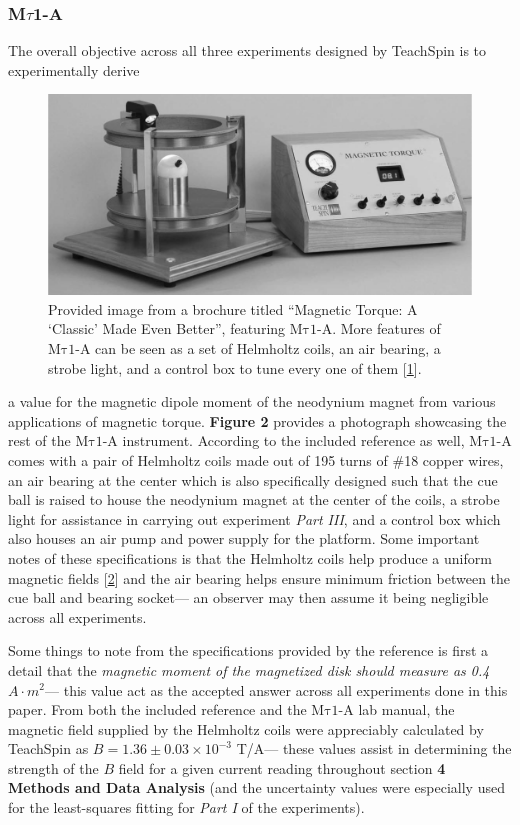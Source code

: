 \documentclass[12pt]{article}
\newcommand{\mtauonea}{\mathrm{M\tau1}\text{-}\mathrm{A}}
\begin{document}
\begin{multicols}{2}
\subsubsection{M$\tau$1-A}
The overall objective across all three experiments designed by TeachSpin
is to experimentally derive
\begin{figure}[H]
    \centering
    \includegraphics[width=0.98\linewidth]{figs/fig2.png}
    \caption{
        Provided image from a brochure titled ``Magnetic Torque: A `Classic' Made Even Better'',
        featuring $\mtauonea$. More features of $\mtauonea$ can be seen as a set of Helmholtz coils,
        an air bearing, a strobe light, and a control box to tune every one of them [\hyperref[sec:1]{1}].
        }
\end{figure}
\noindent
a value for the magnetic dipole moment of the neodynium
magnet from various applications of magnetic torque.
\textbf{Figure 2} provides a photograph showcasing the rest of the $\mtauonea$ instrument.
According to the included reference as well, $\mtauonea$ comes with a pair of Helmholtz coils
made out of 195 turns of \#18 copper wires, an air bearing at the center which is also
specifically designed such that the cue ball is raised to house the neodynium magnet at the
center of the coils, a strobe light for assistance in carrying out experiment \textit{Part III},
and a control box which also houses an air pump and power supply for the platform.
Some important notes of these specifications is that the Helmholtz coils help produce a uniform magnetic
fields [\hyperref[sec:2]{2}] and the air bearing helps ensure minimum friction between the cue ball and bearing socket---
an observer may then assume it being negligible across all experiments.

Some things to note from the specifications provided by the reference is first a detail that
the \textit{magnetic moment of the magnetized disk should measure as 0.4 $A\cdot m^2$}---
this value act as the accepted answer across all experiments done in this paper.
From both the included reference and the $\mtauonea$ lab manual,
the magnetic field supplied by the Helmholtz coils were appreciably calculated by
TeachSpin as $B=1.36\pm0.03\times10^{-3}$ T/A---
these values assist in determining the strength of the $B$ field for a given current reading
throughout section \textbf{4 Methods and Data Analysis}
(and the uncertainty values were especially used for the least-squares fitting for \textit{Part I} of the experiments).


\end{multicols}
\end{document}
